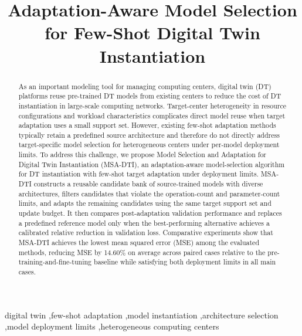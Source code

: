 \documentclass[a4paper,fleqn]{cas-sc}
\begin{document}
\setlength{\abovedisplayskip}{0pt plus 1pt minus 0pt}
\setlength{\belowdisplayskip}{5pt plus 1pt minus 1pt}
\setlength{\abovedisplayshortskip}{0pt plus 1pt minus 0pt}
\setlength{\belowdisplayshortskip}{5pt plus 1pt minus 1pt}


\title[mode=title]{Adaptation-Aware Model Selection for Few-Shot Digital Twin Instantiation}

\begin{abstract}
As an important modeling tool for managing computing centers, digital twin
(DT) platforms reuse pre-trained DT models from existing centers to reduce the
cost of DT instantiation in large-scale computing networks. Target-center
heterogeneity in resource configurations and workload characteristics
complicates direct model reuse when target adaptation uses a small support set.
However, existing few-shot adaptation methods typically retain a predefined
source architecture and therefore do not directly address target-specific
model selection for heterogeneous centers under per-model deployment limits.
To address this challenge, we propose Model Selection and Adaptation for
Digital Twin Instantiation (MSA-DTI), an adaptation-aware model-selection
algorithm for DT instantiation with few-shot target adaptation under deployment
limits. MSA-DTI constructs a reusable candidate bank of source-trained models
with diverse architectures, filters candidates that violate the operation-count
and parameter-count limits, and adapts the remaining candidates using the same
target support set and update budget. It then compares post-adaptation
validation performance and replaces a predefined reference model only when the
best-performing alternative achieves a calibrated relative reduction in
validation loss. Comparative experiments show that MSA-DTI achieves the lowest
mean squared error (MSE) among the evaluated methods, reducing MSE by 14.60\%
on average across paired cases relative to the pre-training-and-fine-tuning
baseline while satisfying both deployment limits in all main cases.
\end{abstract}

\begin{keywords}
digital twin
\sep few-shot adaptation
\sep model instantiation
\sep architecture selection
\sep model deployment limits
\sep heterogeneous computing centers
\end{keywords}

\maketitle
\end{document}
